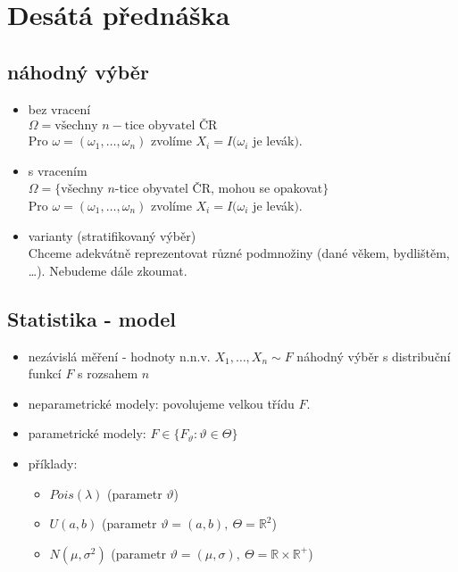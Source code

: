 \documentclass[../main.tex]{subfiles}
\begin{document}
\section{Desátá přednáška}

\subsection{náhodný výběr}
\begin{itemize}
    \item bez vracení \\
    $\Omega = {\text{všechny }n-\text{tice obyvatel ČR}}$\\
    Pro $\omega = (\omega_1,\dots, \omega_n)$ zvolíme $X_i = I(\omega_i$ je levák$)$.
    \item s vracením \\
    $\Omega = \{$všechny $n$-tice obyvatel ČR, mohou se opakovat$\}$\\
    Pro $\omega = (\omega_1,\dots,\omega_n)$ zvolíme $X_i = I(\omega_i$ je levák$)$.
    \item varianty (stratifikovaný výběr)\\
    Chceme adekvátně reprezentovat různé podmnožiny
    (dané věkem, bydlištěm, \dots ).
    Nebudeme dále zkoumat.
\end{itemize}

\subsection{Statistika - model}
\begin{itemize}
    \item nezávislá měření - hodnoty n.n.v. $X_1,\dots,X_n \sim F$ náhodný výběr s distribuční funkcí $F$ s rozsahem $n$
    \item neparametrické modely: povolujeme velkou třídu $F$.
    \item parametrické modely: $F \in \{F_\vartheta: \vartheta \in \Theta\}$
    \item příklady:
    \begin{itemize}
        \item $Pois(\lambda)$ (parametr $\vartheta$)
        \item $U(a,b)$ (parametr $\vartheta = (a,b),\ \Theta = \mathbb{R}^2$) 
        \item $N(\mu, \sigma^2)$ (parametr $\vartheta = (\mu,\sigma),\ \Theta =
            \mathbb{R} \times \mathbb{R}^{+}$)
    \end{itemize}
\end{itemize}
\end{document}
